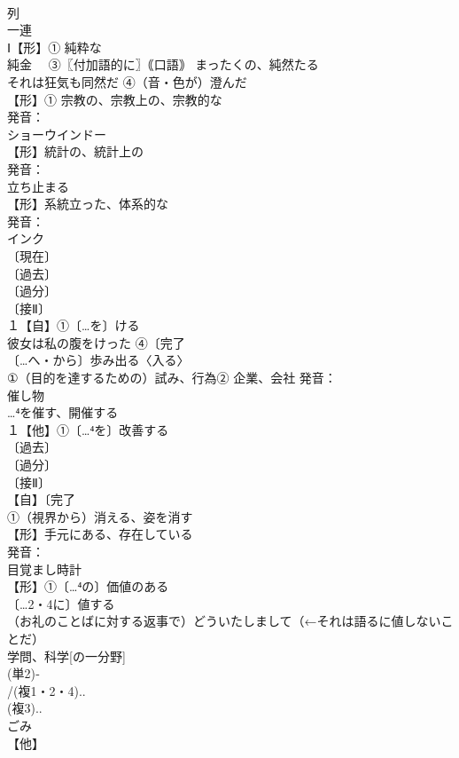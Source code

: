 \documentclass[8pt]{extreport}
\begin{document}
\begin{CJK}{UTF8}{min}
\\	列 
\\	一連
\\	Ⅰ【形】① 純粋な 
\\	純金　 ③〖付加語的に〗｟口語｠ まったくの、純然たる 
\\	それは狂気も同然だ ④（音・色が）澄んだ
\\	【形】① 宗教の、宗教上の、宗教的な 
\\	発音：
\\	ショーウインドー
\\	【形】統計の、統計上の 
\\	発音：
\\	立ち止まる 
\\	【形】系統立った、体系的な 
\\	発音：
\\	インク 
\\	〔現在〕
\\	〔過去〕
\\	〔過分〕
\\	〔接Ⅱ〕
\\	１【自】①〔…を〕ける 
\\	彼女は私の腹をけった ④〔完了
\\	〔…へ・から〕歩み出る〈入る〉 
\\	①（目的を達するための）試み、行為② 企業、会社 発音：
\\	催し物 
\\	…⁴を催す、開催する
\\	１【他】①〔…⁴を〕改善する 
\\	〔過去〕
\\	〔過分〕
\\	〔接Ⅱ〕
\\	【自】〔完了
\\	①（視界から）消える、姿を消す
\\	【形】手元にある、存在している 
\\	発音：
\\	目覚まし時計 
\\	【形】①〔…⁴の〕価値のある 
\\	〔…2・4に〕値する 
\\	（お礼のことばに対する返事で）どういたしまして（←それは語るに値しないことだ）
\\	学問、科学[の一分野]
\\	(単2)‐
\\	/(複1・2・4)..
\\	(複3)..
\\	ごみ 
\\	【他】

\end{CJK}
\end{document}

